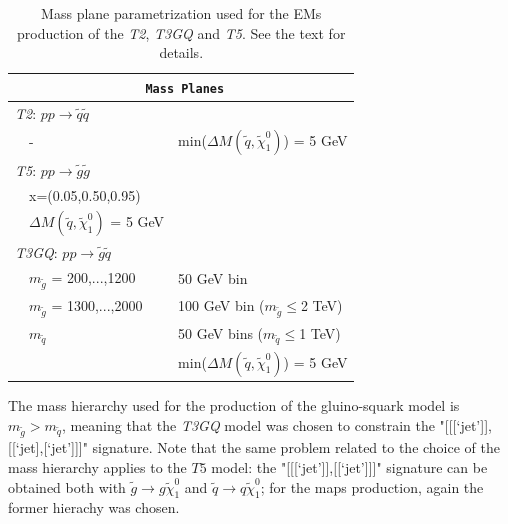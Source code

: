 \documentclass[a4paper,10pt]{article}
\newcommand{\TGQ}{ \textit{T3GQ}}
\newcommand{\Ttwo}{ \textit{T2}}
\newcommand{\Tfive}{ \textit{T5}}
\begin{document}
\begin{table}
\footnotesize

\begin{center}
\renewcommand{\arraystretch}{1.0}
\begin{tabular}{ l l l }  \toprule \toprule 
\multicolumn{3}{c}{\texttt{ \normalsize \textbf{Mass Planes}}} \\ \toprule \toprule
\multicolumn{3}{l}{\Ttwo: $p p \rightarrow \tilde q \tilde q$} \\
     & - & min($\Delta M(\tilde q, \tilde \chi _1 ^0)$) = 5 GeV \\ \midrule
\multicolumn{3}{l}{\Tfive: $p p \rightarrow \tilde g \tilde g$} \\ 
     &x=(0.05,0.50,0.95) &  \\ 
     &$\Delta M(\tilde q, \tilde \chi _1 ^0)$ = 5 GeV&  \\ \midrule
\multicolumn{3}{l}{\TGQ: $p p \rightarrow \tilde g \tilde q$} \\  
     & $m_{\tilde g}$ = 200,...,1200 & 50 GeV bin \\ 
     & $m_{\tilde g}$ = 1300,...,2000 & 100 GeV bin ($m_{\tilde g}\leq$2 TeV) \\
     & $m_{\tilde q}$ & 50 GeV bins ($m_{\tilde q}\leq$1 TeV) \\
     & & min($\Delta M(\tilde q, \tilde \chi _1 ^0)$) = 5 GeV \\ \bottomrule \bottomrule
\end{tabular}
\end{center}
\caption{Mass plane parametrization used for the EMs production of the \textit{T2}, \textit{T3GQ} and \textit{T5}. See the text for details.}
\label{TGQ_Planes} 
\end{table}
%
The mass hierarchy used for the production of the gluino-squark model is $m_{\tilde g} > m_{\tilde q}$, meaning that the \textit{T3GQ} model was chosen to constrain the "[[[`jet']],[[`jet],[`jet']]]" signature. Note that the same problem related to the choice of the mass hierarchy applies to the $T5$ model: the "[[[`jet']],[[`jet']]]" signature can be obtained both with $\tilde g \rightarrow g \tilde \chi _1 ^0$ and $\tilde q \rightarrow q \tilde \chi _1 ^0$; for the maps production, again the former hierachy was chosen. 
%
\end{document}
